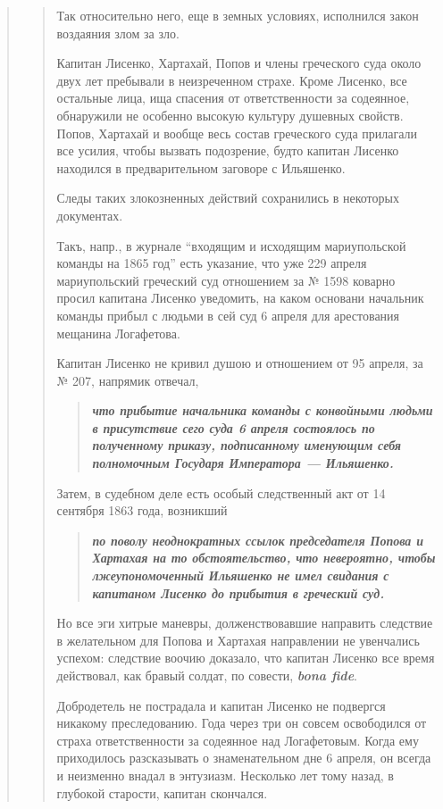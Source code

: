 \begin{quote}
\begin{quote}
Так относительно него, еще в земных условиях,
исполнился закон воздаяния злом за зло.

Капитан Лисенко, Хартахай, Попов и члены греческого суда 
около двух лет пребывали в неизреченном страхе. Кроме Лисенко, все остальные лица, ища спасения
от ответственности за содеянное, обнаружили не особенно
высокую культуру душевных свойств. Попов, Хартахай
и вообще весь состав греческого суда прилагали все усилия, 
чтобы вызвать подозрение, будто капитан Лисенко находился 
в предварительном заговоре с Ильяшенко.

Следы таких злокозненных действий сохранились в
некоторых документах.

Такъ, напр., в журнале ``входящим и исходящим
мариупольской команды на 1865 год'' есть указание, что
уже 229 апреля мариупольский греческий суд отношением 
за № 1598 коварно просил капитана Лисенко уведомить,
на каком основани начальник команды прибыл с людьми в сей суд 6 апреля для 
арестования мещанина Логафетова.

Капитан Лисенко не кривил душою и отношением от 95 апреля, за № 207, напрямик
отвечал, 

\begin{quote}
\em\bfseries
что прибытие начальника команды с конвойными людьми в
присутствие сего суда 6 апреля состоялось по полученному
приказу, подписанному именующим себя полномочным
Государя Императора — Ильяшенко.
\end{quote}

Затем, в судебном деле есть особый следственный
акт от 14 сентября 1863 года, возникший 
\begin{quote}
\em\bfseries
по поволу неоднократных ссылок председателя Попова и Хартахая
на то обстоятельство, что невероятно, чтобы лжеупономоченный 
Ильяшенко не имел свидания с капитаном Лисенко до прибытия в греческий суд.
\end{quote}

Но все эги хитрые маневры, долженствовавшие направить следствие в желательном для Попова и Хартахая
направлении не увенчались успехом: следствие воочию доказало, что капитан Лисенко все время действовал, как бравый
солдат, по совести, \textbf{\em bona fide}.

Добродетель не пострадала и капитан Лисенко не подвергся никакому
преследованию. Года через три он совсем освободился от страха ответственности
за содеянное над Логафетовым.  Когда ему приходилось разсказывать о
знаменательном дне 6 апреля, он всегда и неизменно внадал в энтузиазм.
Несколько лет тому назад, в глубокой старости, капитан скончался. 


\end{quote}
\end{quote}
